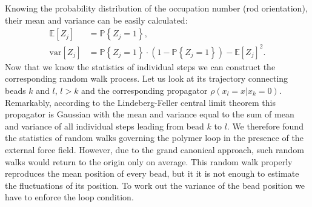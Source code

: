 \documentclass[aps,showpacs,twocolumn,floatfix,prx,superscriptaddress]{revtex4-1}
\begin{document}
Knowing the probability distribution of the occupation number (rod orientation),
their mean and variance can be easily calculated:
\begin{subequations}
    \begin{align}
        \label{eq:zmean}
        \mathbb{E}\left[Z_j\right] & =  \mathbb{P} \left\{ Z_j = 1\right\} ,\\
        \label{eq:zvar}
        \text{var}\left[Z_j\right] & = \mathbb{P} \left\{ Z_j = 1\right\} \cdot
        \left( 1 - \mathbb{P} \left\{ Z_j = 1\right\} \right) -
        \mathbb{E}\left[Z_j\right]^2.
    \end{align}
\end{subequations}
Now that we know the statistics of individual steps we can construct the
corresponding random walk process. Let us look at its trajectory connecting
beads $k$ and $l$, $l>k$ and the corresponding propagator $\rho(x_l=x|x_k=0)$.
Remarkably, according to the Lindeberg-Feller central limit theorem \cite{} this
propagator is  Gaussian with the mean and variance equal to the sum of mean and
variance of all individual steps leading from bead $k$ to $l$. We therefore
found the statistics of random walks governing the polymer loop in the presence
of the external force field. However, due to the grand canonical approach, such
random walks would return to the origin only on average. This random walk
properly reproduces the mean position of every bead, but it it is not enough to
estimate the fluctuations of its position. To work out the variance of the bead
position we have to enforce the loop condition.
 
\end{document}
